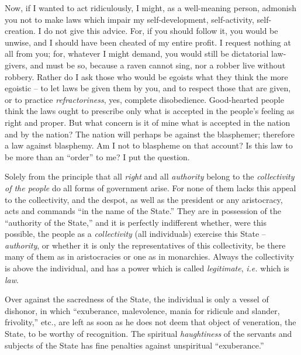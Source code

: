 \documentclass[12pt,a4paper]{book}
\begin{document}
Now, if I wanted to act ridiculously, I might, as a well-meaning person, 
admonish you not to make laws which impair my self-development, self-activity, 
self-creation. I do not give this advice. For, if you should follow it, you 
would be unwise, and I should have been cheated of my entire profit. I request 
nothing at all from you; for, whatever I might demand, you would still be 
dictatorial law-givers, and must be so, because a raven cannot sing, nor a 
robber live without robbery. Rather do I ask those who would be egoists what 
they think the more egoistic -- to let laws be given them by you, and to 
respect those that are given, or to practice \textit{refractoriness}, yes, 
complete disobedience. Good-hearted people think the laws ought to prescribe 
only what is accepted in the people's feeling as right and proper. But what 
concern is it of mine what is accepted in the nation and by the nation? The 
nation will perhaps be against the blasphemer; therefore a law against 
blasphemy. Am I not to blaspheme on that account? Is this law to be more than 
an ``order'' to me? I put the question.

Solely from the principle that all \textit{right} and all \textit{authority} 
belong to the \textit{collectivity of the people} do all forms of government 
arise. For none of them lacks this appeal to the collectivity, and the despot, 
as well as the president or any aristocracy, acts and commands ``in the name 
of the State.'' They are in possession of the ``authority of the State,'' 
and it is perfectly indifferent whether, were this possible, the people as a 
\textit{collectivity} (all individuals) exercise this State -- 
\textit{authority}, or whether it is only the representatives of this 
collectivity, be there many of them as in aristocracies or one as in 
monarchies. Always the collectivity is above the individual, and has a power 
which is called \textit{legitimate}, \textit{i.e.} which is \textit{law}.

Over against the sacredness of the State, the individual is only a vessel of 
dishonor, in which ``exuberance, malevolence, mania for ridicule and slander, 
frivolity,'' etc., are left as soon as he does not deem that object of 
veneration, the State, to be worthy of recognition. The spiritual 
\textit{haughtiness} of the servants and subjects of the State has fine 
penalties against unspiritual ``exuberance.''
\end{document}
